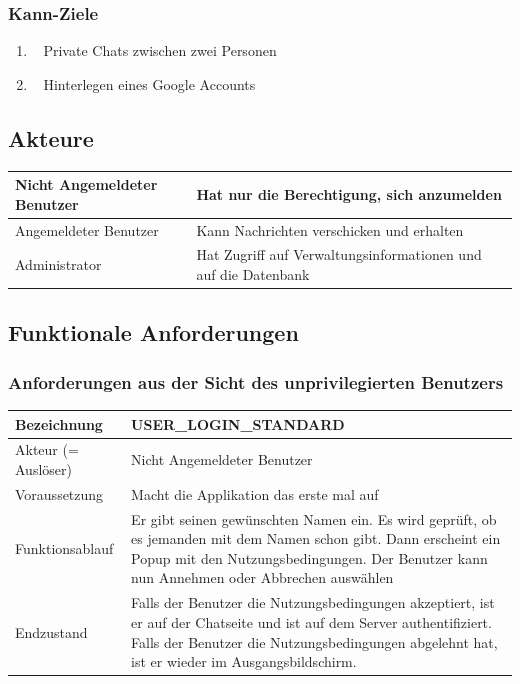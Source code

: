 \documentclass[12pt]{article}
\newcommand{\requirementTable}[5]{
    \begin{table}[H]
      \begin{tabularx}{\textwidth}{|l|X|}
        \hline
        Bezeichnung & #1  \\ \hline
        Akteur (= Auslöser) & #2  \\ \hline
        Voraussetzung & #3  \\ \hline
        Funktionsablauf & #4  \\ \hline
        Endzustand & #5  \\ \hline
      \end{tabularx}
    \end{table}
}
\begin{document}
      \subsubsection{Kann-Ziele}
        \begin{enumerate}
          \item \faUsers~ Private Chats zwischen zwei Personen
          \item \faGoogle~ Hinterlegen eines Google Accounts
        \end{enumerate}

    \subsection{Akteure}
        \begin{table}[H]
          \begin{tabularx}{\textwidth}{|l|X|}
            \hline
            Nicht Angemeldeter Benutzer & Hat nur die Berechtigung, sich anzumelden  \\ \hline
            Angemeldeter Benutzer & Kann Nachrichten verschicken und erhalten  \\ \hline
            Administrator & Hat Zugriff auf Verwaltungsinformationen und auf die Datenbank \\ \hline
          \end{tabularx}
        \end{table}


    \subsection{Funktionale Anforderungen}
      \subsubsection{Anforderungen aus der Sicht des unprivilegierten Benutzers}
        \requirementTable
            {USER\_LOGIN\_STANDARD}
            {Nicht Angemeldeter Benutzer}
            {Macht die Applikation das erste mal auf}
            {
            Er gibt seinen gewünschten Namen ein. \newline
            Es wird geprüft, ob es jemanden mit dem Namen schon gibt. \newline
            Dann erscheint ein Popup mit den Nutzungsbedingungen. Der Benutzer kann nun Annehmen oder Abbrechen auswählen
            }
            {
            Falls der Benutzer die Nutzungsbedingungen akzeptiert, ist er auf der Chatseite und ist auf dem Server authentifiziert. Falls der Benutzer die Nutzungsbedingungen abgelehnt hat, ist er wieder im Ausgangsbildschirm.
            }
            
\end{document}
